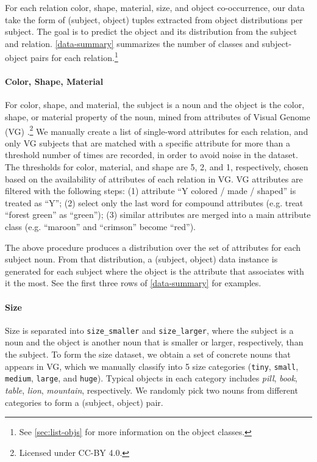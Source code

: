 \documentclass[11pt]{article}
\begin{document}
For each relation color, shape, material, size, and object co-occurrence, our data take the form of (subject, object) tuples extracted from object distributions per subject. The goal is to predict the object and its distribution from the subject and relation. \cref{data-summary} summarizes the number of classes and subject-object pairs for each relation.\footnote{See \cref{sec:list-objs} for more information on the object classes.}

\paragraph{Color, Shape, Material}
For color, shape, and material, the subject is a noun and the object is the color, shape, or material property of the noun, mined from attributes of Visual Genome (VG) \citep{VG}.\footnote{Licensed under CC-BY 4.0.} We manually create a list of single-word attributes for each relation, and only VG subjects that are matched with a specific attribute for more than a threshold number of times are recorded, in order to avoid noise in the dataset. The thresholds for color, material, and shape are 5, 2, and 1, respectively, chosen based on the availability of attributes of each relation in VG. VG attributes are filtered with the following steps: (1) attribute ``Y colored / made / shaped'' is treated as ``Y''; (2) select only the last word for compound attributes (e.g. treat ``forest green'' as ``green''); (3) similar attributes are merged into a main attribute class (e.g. ``maroon'' and ``crimson'' become ``red'').

The above procedure produces a distribution over the set of attributes for each subject noun. 
From that distribution, a (subject, object) data instance is generated for each subject where the object is the attribute that associates with it the most.
See the first three rows of \cref{data-summary} for examples.

\paragraph{Size}
Size is separated into {\tt{size\_smaller}} and {\tt{size\_larger}}, where the subject is a noun and the object is another noun that is smaller or larger, respectively, than the subject. 
To form the size dataset, we obtain a set of concrete nouns that appears in VG, which we manually classify into 5 size categories ({\tt{tiny}}, {\tt{small}}, {\tt{medium}}, {\tt{large}}, and {\tt{huge}}). Typical objects in each category includes \emph{pill}, \emph{book}, \emph{table}, \emph{lion}, \emph{mountain}, respectively.
We randomly pick two nouns from different categories to form a (subject, object) pair. 
\end{document}
